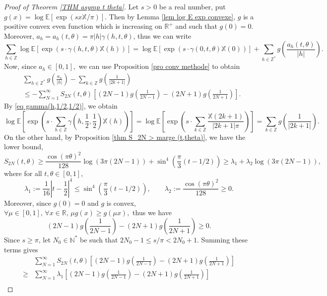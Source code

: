 \documentclass[12pt]{amsart}
\theoremstyle{definition}
\numberwithin{equation}{section}
\numberwithin{equation}{section}
\def\E{\mathbb{E}}
\def\R{\mathbb{R}}
\def\Z{\mathbb{Z}}
\def\X{\mathbb{X}}
\def\E{\mathbb{E}}
\begin{document}
\begin{proof}[Proof of Theorem \ref{THM asymp t theta}]
Let $s>0$ be a real number, put $g(x) = \log\E\left[\exp\left(s x\X/\pi\right)\right]$. Then by Lemma \ref{lem log E exp convexe}, $g$ is a positive convex even  function which is increasing on $\R^+$ and such that $g(0) = 0$. Moreover, $ a_{h} = a_{h}(t, \theta) = \pi|h|\gamma(h,t,\theta)$, thus we can write
\[\sum_{h\in \Z} \log \E \left[\exp \left(s \cdot  \gamma(h,t,\theta)\X(h)\right) \right] 
= \log \E \left[\exp \left(s \cdot  \gamma(0,t,\theta)\X(0)\right) \right]
+\sum_{h \in\Z^*} g \left(\frac{a_h(t,\theta)}{|h|
}\right).
\] 
Now, since $a_h\in[0,1],$ we can use Proposition \ref{pro conv methode} to obtain
\begin{align*}&\sum_{h \in\Z^*} g \left(\frac{a_h}{|h|}\right)-
\sum_{k\in\Z} g\left(\frac{1}{|2k+1|}\right) \\
&\leq 
-\sum_{N = 1}^{\infty} S_{2N}(t,\theta) \left[
(2N-1)g\left(\frac{1}{2N-1}\right)
-(2N+1)g\left(\frac{1}{2N+1}\right)\right].
\end{align*}
By \eqref{eq gamma(h,1/2,1/2)}, we obtain
\[
\log \E \left[\exp \left(s \cdot \sum_{h\in \Z} \gamma\left(h,\frac{1}{2},\frac{1}{2}\right)\X(h)\right)\right]
= \log \E \left[\exp \left(s \cdot \sum_{k\in \Z} \frac{\X(2k+1)}{|2k+1|\pi}\right)\right] = \sum_{k\in\Z} g\left(\frac{1}{|2k+1|}\right).\]
On the other hand, by Proposition \ref{thm S_2N > marge (t,theta)}, we have the lower bound,
\[S_{2N}(t,\theta)
    \geq  
    \frac{\cos(\pi\theta)^2}{128}\log(3\pi(2N-1))
    +\sin^4\left(\frac{\pi}{3}(t-1/2)\right) 
    \geq\lambda_1+\lambda_2 \log(3\pi(2N-1)),
\]
where for all $t,\theta\in[0,1],$
\[
\lambda_1 :=  \frac{1}{16}\left|t-\frac{1}{2}\right|^4
\leq 
    \sin^4\left(\frac{\pi}{3}(t-1/2)\right), \qquad
\lambda_2 :=   
    \frac{\cos(\pi\theta)^2}{128}
    \geq 0. 
\]
Moreover, since $g(0)=0$ and $g$ is convex, $\forall \mu\in[0,1],\, \forall x\in\R , \, \mu g( x)\geq  g(\mu x), $
thus we have
\[(2N-1)g\left(\frac{1}{2N-1}\right)
-(2N+1)g\left(\frac{1}{2N+1}\right)
\geq 0.
\]
Since $s \geq \pi $, let \(N_0 \in \mathbb{N}^*\) be such that
$2N_0-1 \leq s/\pi < 2N_0+1.$
Summing these terms gives
\begin{align*}
    &\sum_{N = 1}^{\infty} S_{2N}(t,\theta) \left[
(2N-1)g\left(\frac{1}{2N-1}\right)
-(2N+1)g\left(\frac{1}{2N+1}\right)\right]\\
\geq& \sum_{N = 1}^{\infty}  \lambda_1\left[
(2N-1)g\left(\frac{1}{2N-1}\right)
-(2N+1)g\left(\frac{1}{2N+1}\right)\right]\\

\end{align*}
\end{proof}
\end{document}
